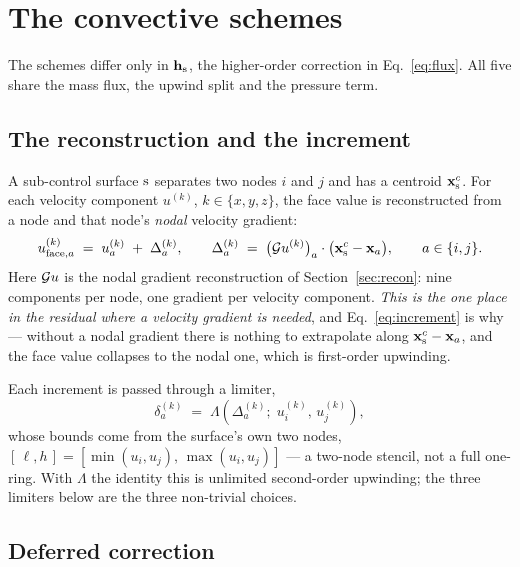 \section{The convective schemes}
\label{sec:schemes}

The schemes differ only in $\mathbf{h}_{\mathrm{s}}$, the higher-order correction in
Eq.~\eqref{eq:flux}. All five share the mass flux, the upwind split and the pressure term.

\subsection{The reconstruction and the increment}
\label{sec:schemes:recon}

A sub-control surface $\mathrm{s}$ separates two nodes $i$ and $j$ and has a centroid $\mathbf{x}^c_{\mathrm{s}}$.
For each velocity component $u^{(k)}$, $k \in \{x,y,z\}$, the face value is reconstructed from a
node and that node's \emph{nodal} velocity gradient:
\begin{equation}
u^{(k)}_{\text{face},a} \;=\; u^{(k)}_a \;+\; \Delta^{(k)}_a ,
\qquad
\Delta^{(k)}_a \;=\; \bigl(\mathcal{G} u^{(k)}\bigr)_a \cdot \bigl(\mathbf{x}^c_{\mathrm{s}} - \mathbf{x}_a\bigr),
\qquad a \in \{i,j\}.
\label{eq:increment}
\end{equation}
Here $\mathcal{G} u$ is the nodal gradient reconstruction of Section~\ref{sec:recon}: nine components
per node, one gradient per velocity component. \emph{This is the one place in the residual where a
velocity gradient is needed}, and Eq.~\eqref{eq:increment} is why --- without a nodal gradient
there is nothing to extrapolate along $\mathbf{x}^c_{\mathrm{s}} - \mathbf{x}_a$, and the face value collapses to
the nodal one, which is first-order upwinding.

Each increment is passed through a limiter,
\begin{equation}
\delta^{(k)}_a \;=\; \Lambda\!\left(\Delta^{(k)}_a;\; u^{(k)}_i,\, u^{(k)}_j\right),
\label{eq:limited}
\end{equation}
whose bounds come from the surface's own two nodes, $[\,\ell, h\,] =
[\min(u_i,u_j),\,\max(u_i,u_j)]$ --- a two-node stencil, not a full one-ring. With $\Lambda$ the
identity this is unlimited second-order upwinding; the three limiters below are the three
non-trivial choices.

\subsection{Deferred correction}

